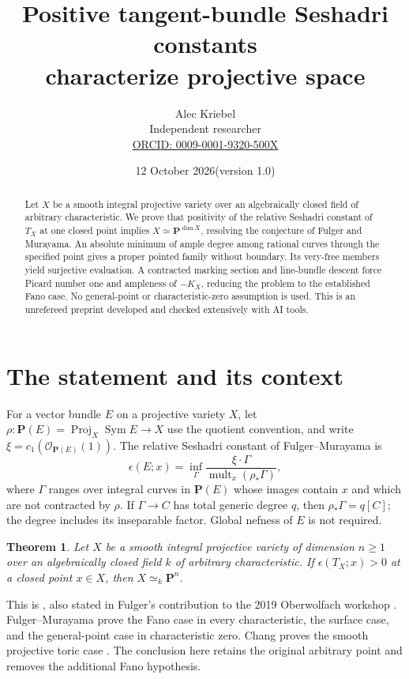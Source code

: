 \documentclass[11pt]{article}
\title{Positive tangent-bundle Seshadri constants\protect\\characterize projective space}
\author{Alec Kriebel\\[2pt]\small Independent researcher\\
\small\href{https://orcid.org/0009-0001-9320-500X}{ORCID: 0009-0001-9320-500X}}
\date{12 October 2026\quad (version 1.0)}
\newtheorem{theorem}{Theorem}
\newcommand{\PP}{\mathbf P}
\newcommand{\OO}{\mathcal O}
\newcommand{\mult}{\operatorname{mult}}
\begin{document}
\maketitle
\begin{abstract}
Let $X$ be a smooth integral projective variety over an algebraically closed
field of arbitrary characteristic. We prove that positivity of the relative
Seshadri constant of $T_X$ at one closed point implies $X\simeq\PP^{\dim X}$,
resolving the conjecture of Fulger and Murayama. An absolute minimum of ample
degree among rational curves through the specified point gives a proper
pointed family without boundary. Its very-free members yield surjective
evaluation. A contracted marking section and line-bundle descent force
Picard number one and ampleness of $-K_X$, reducing the problem to the
established Fano case. No general-point or characteristic-zero assumption is
used. This is an unrefereed preprint developed and checked extensively with
AI tools.
\end{abstract}

\section{The statement and its context}

For a vector bundle $E$ on a projective variety $X$, let
$\rho:\PP(E)=\operatorname{Proj}_X\operatorname{Sym} E\to X$ use the
quotient convention, and write $\xi=c_1(\OO_{\PP(E)}(1))$. The relative
Seshadri constant of Fulger--Murayama is
\begin{equation}\label{eq:definition}
 \epsilon(E;x)=\inf_{\Gamma}\frac{\xi\cdot\Gamma}
 {\mult_x(\rho_*\Gamma)},
\end{equation}
where $\Gamma$ ranges over integral curves in $\PP(E)$ whose images contain
$x$ and which are not contracted by $\rho$. If $\Gamma\to C$ has total
generic degree $q$, then $\rho_*\Gamma=q[C]$; the degree includes its
inseparable factor. Global nefness of $E$ is not required.

\begin{theorem}\label{thm:main}
Let $X$ be a smooth integral projective variety of dimension $n\geq1$ over
an algebraically closed field $k$ of arbitrary characteristic. If
$\epsilon(T_X;x)>0$ at a closed point $x\in X$, then $X\simeq_k\PP^n$.
\end{theorem}

This is \cite[Conjecture 4.9]{FM}, also stated in Fulger's contribution to
the 2019 Oberwolfach workshop \cite[p.~3289]{OWR}. Fulger--Murayama prove
the Fano case in every characteristic, the surface case, and the
general-point case in characteristic zero. Chang proves the smooth
projective toric case \cite[Theorem 0.2]{Chang}. The conclusion here retains
the original arbitrary point and removes the additional Fano hypothesis.
\end{document}
